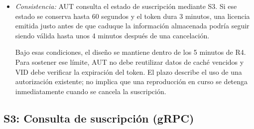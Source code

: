 \begin{itemize}
\begin{itemize}
        Si todas las instancias quedan fuera de servicio (F1), no se emitirán licencias nuevas. Un reproductor con token vigente podrá solicitar segmentos mientras VID siga aceptándolo. Cuando el token venza, la reproducción necesitará una nueva autorización; si AUT continúa caído, no podrá obtenerla.

        \item \textit{Consistencia:}
        AUT consulta el estado de suscripción mediante S3. Si ese estado se conserva hasta 60 segundos y el token dura 3 minutos, una licencia emitida justo antes de que caduque la información almacenada podría seguir siendo válida hasta unos 4 minutos después de una cancelación.

        Bajo esas condiciones, el diseño se mantiene dentro de los 5 minutos de R4. Para sostener ese límite, AUT no debe reutilizar datos de caché vencidos y VID debe verificar la expiración del token. El plazo describe el uso de una autorización existente; no implica que una reproducción en curso se detenga inmediatamente cuando se cancela la suscripción.
    \end{itemize}
\end{itemize}

\subsection{S3: Consulta de suscripción (gRPC)}
\label{sub:s3}

